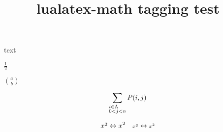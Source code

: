\documentclass{article}
\title{lualatex-math tagging test}
\begin{document}
text

$\frac{1}{2}$

$\genfrac{(}{)}{0pt}{}{a}{b}$

\[
\sum_{\begin{subarray}{l}
i\in\Lambda\\ 0<j<n
\end{subarray}}
P(i,j)
\]

\[
\cramped{x^2} \leftrightarrow x^2 \quad
\cramped[\scriptstyle]{x^2} \leftrightarrow {\scriptstyle x^2}
\]
\end{document}

